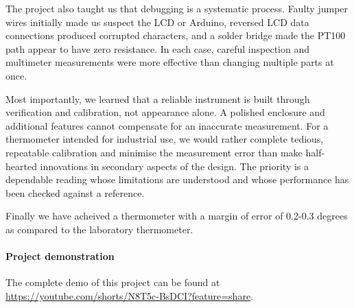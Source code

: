 \documentclass[12pt,a4paper]{article}
\begin{document}
The project also taught us that debugging is a systematic process.
Faulty jumper wires initially made us suspect the LCD or Arduino, reversed
LCD data connections produced corrupted characters, and a solder bridge
made the PT100 path appear to have zero resistance. In each case, careful
inspection and multimeter measurements were more effective than changing
multiple parts at once.

Most importantly, we learned that a reliable instrument is built through
verification and calibration, not appearance alone. A polished enclosure
and additional features cannot compensate for an inaccurate measurement.
For a thermometer intended for industrial use, we would rather complete
tedious, repeatable calibration and minimise the measurement error than
make half-hearted innovations in secondary aspects of the design. The
priority is a dependable reading whose limitations are understood and
whose performance has been checked against a reference.

Finally we have acheived a thermometer with a margin of error of 0.2-0.3 degrees as compared to the laboratory thermometer.

\paragraph{Project demonstration}
The complete demo of this project can be found at
{\color[RGB]{0, 51, 153}\url{https://youtube.com/shorts/N8T5c-BsDCI?feature=share}}.
\end{document}
